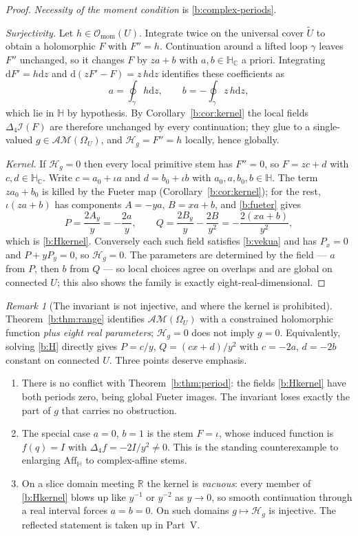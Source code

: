 \documentclass[11pt,a4paper]{article}
\numberwithin{equation}{section}
\theoremstyle{definition}
\theoremstyle{remark}
\newtheorem{remark}[theorem]{Remark}
\theoremstyle{plain}
\newcommand{\HH}{\mathbb H}
\newcommand{\HC}{\mathbb H_{\mathbb C}}
\newcommand{\RR}{\mathbb R}
\newcommand{\lap}{\Delta_4}
\newcommand{\I}{\mathcal I}
\newcommand{\AM}{\mathcal{AM}}
\newcommand{\Om}{\Omega}
\newcommand{\Aff}{\mathrm{Aff}_{\HH}}
\newcommand{\Omom}{\mathcal O_{\mathrm{mom}}}
\newcommand{\Hg}{\mathcal H_{g}}      %
\newcommand{\dd}{\mathrm d}
\begin{document}
\begin{proof}
\emph{Necessity of the moment condition} is \eqref{b:complex-periods}.

\emph{Surjectivity.}  Let $h\in\Omom(U)$.  Integrate twice on the universal
cover $\widetilde U$ to obtain a holomorphic $F$ with $F''=h$.  Continuation
around a lifted loop $\gamma$ leaves $F''$ unchanged, so it changes $F$ by
$za+b$ with $a,b\in\HC$ a priori.  Integrating $\dd F'=h\dd z$ and
$\dd(zF'-F)=z\,h\dd z$ identifies these coefficients as
\[
 a=\oint_\gamma h\dd z,\qquad b=-\oint_\gamma z\,h\dd z,
\]
which lie in $\HH$ by hypothesis.  By Corollary~\ref{b:cor:kernel} the local
fields $\lap\I(F)$ are therefore unchanged by every continuation; they glue to
a single-valued $g\in\AM(\Om_U)$, and $\Hg=F''=h$ locally, hence globally.

\emph{Kernel.}  If $\Hg=0$ then every local primitive stem has $F''=0$, so
$F=zc+d$ with $c,d\in\HC$.  Write $c=a_0+\iota a$ and $d=b_0+\iota b$ with
$a_0,a,b_0,b\in\HH$.  The term $za_0+b_0$ is killed by the Fueter map
(Corollary~\ref{b:cor:kernel}); for the rest, $\iota(za+b)$ has components
$A=-ya$, $B=xa+b$, and \eqref{b:fueter} gives
\[
 P=\frac{2A_y}{y}=-\frac{2a}{y},
 \qquad
 Q=\frac{2B_y}{y}-\frac{2B}{y^2}=-\frac{2(xa+b)}{y^2},
\]
which is \eqref{b:Hkernel}.  Conversely each such field satisfies
\eqref{b:vekua} and has $P_x=0$ and $P+yP_y=0$, so $\Hg=0$.  The parameters
are determined by the field --- $a$ from $P$, then $b$ from $Q$ --- so local
choices agree on overlaps and are global on connected $U$; this also shows
the family is exactly eight-real-dimensional.
\end{proof}

\begin{remark}[The invariant is not injective, and where the kernel is
prohibited]
\label{b:rem:notinjective}
Theorem~\ref{b:thm:range} identifies $\AM(\Om_U)$ with a constrained
holomorphic function \emph{plus eight real parameters}; $\Hg=0$ does not
imply $g=0$.  Equivalently, solving \eqref{b:H} directly gives
$P=c/y$, $Q=(cx+d)/y^2$ with $c=-2a$, $d=-2b$ constant on connected $U$.
Three points deserve emphasis.
\begin{enumerate}[label=\textup{(\alph*)}]
\item There is no conflict with Theorem~\ref{b:thm:period}: the fields
\eqref{b:Hkernel} have both periods zero, being global Fueter images.  The
invariant loses exactly the part of $g$ that carries no obstruction.
\item The special case $a=0$, $b=1$ is the stem $F=\iota$, whose induced
function is $f(q)=I$ with $\lap f=-2I/y^2\neq0$.  This is the standing
counterexample to enlarging $\Aff$ to complex-affine stems.
\item On a slice domain meeting $\RR$ the kernel is \emph{vacuous}: every
member of \eqref{b:Hkernel} blows up like $y^{-1}$ or $y^{-2}$ as $y\to0$, so
smooth continuation through a real interval forces $a=b=0$.  On such domains
$g\mapsto\Hg$ is injective.  The reflected statement is taken up in Part~V.
\end{enumerate}
\end{remark}
\end{document}
